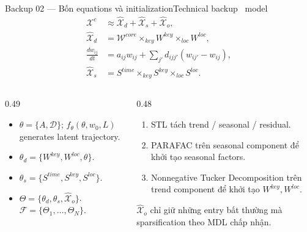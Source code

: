 \documentclass[aspectratio=169,11pt]{beamer}
\begin{document}
\begin{frame}[shrink=44]{Backup 02 --- Bốn equations và initialization}{Technical backup \textperiodcentered\ model}
\small
\begin{align}
  \mathcal X^c&\approx\widehat{\mathcal X}_d+\widehat{\mathcal X}_s+\widehat{\mathcal X}_o,\\
  \widehat{\mathcal X}_d&=\mathcal W^{core}\times_{key}W^{key}\times_{loc}W^{loc},\\
  \frac{dw_{ij}}{dt}&=a_{ij}w_{ij}+\sum_{j'}d_{ijj'}(w_{ij'}-w_{ij}),\\
  \widehat{\mathcal X}_s&=S^{time}\times_{key}S^{key}\times_{loc}S^{loc}.
\end{align}
\vspace{2mm}
\begin{columns}[T,onlytextwidth]
\begin{column}{0.49\textwidth}
\begin{mathcard}
  \begin{itemize}
    \item $\theta=\{A,\mathcal D\}$; $f_\theta(\theta,w_0,L)$ generates latent trajectory.
    \item $\theta_d=\{W^{key},W^{loc},\theta\}$.
    \item $\theta_s=\{S^{time},S^{key},S^{loc}\}$.
    \item $\Theta=\{\theta_d,\theta_s,\widehat{\mathcal X}_o\}$.
    $\mathcal F=\{\Theta_1,\ldots,\Theta_N\}$.
  \end{itemize}
\end{mathcard}
\end{column}
\begin{column}{0.48\textwidth}
\begin{intuition}
  \begin{enumerate}
    \item STL tách trend / seasonal / residual.
    \item PARAFAC trên seasonal component để khởi tạo seasonal factors.
    \item Nonnegative Tucker Decomposition trên trend component để khởi tạo $W^{key},W^{loc}$.
  \end{enumerate}
\end{intuition}
\vspace{3mm}
\begin{takeaway}
  $\widehat{\mathcal X}_o$ chỉ giữ những entry bất thường mà sparsification theo MDL chấp nhận.
\end{takeaway}
\end{column}
\end{columns}
\vspace{2mm}
\end{frame}
\end{document}
